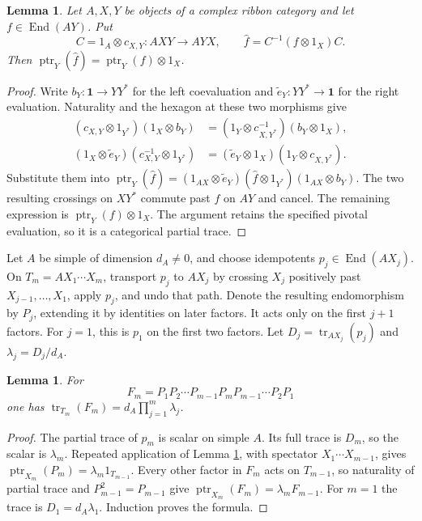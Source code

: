 \documentclass[10pt]{amsart}
\newcommand{\one}{\mathbf1}\newcommand{\C}{\mathcal C}
\newcommand{\tr}{\operatorname{tr}}\newcommand{\ptr}{\operatorname{ptr}}
\newtheorem{lemma}[theorem]{Lemma}
\begin{document}
\begin{lemma}\label{trace-superpose}
Let $A,X,Y$ be objects of a complex ribbon category and let
$f\in\operatorname{End}(A Y)$. Put
\[
 C=1_A\otimes c_{X,Y}:A X Y\longrightarrow A Y X,
 \qquad \widehat f=C^{-1}(f\otimes1_X)C.
\]
Then $\ptr_Y(\widehat f)=\ptr_Y(f)\otimes1_X$.
\end{lemma}
\begin{proof}
Write $b_Y:\one\to YY^*$ for the left coevaluation and
$\widetilde e_Y:YY^*\to\one$ for the right evaluation.
Naturality and the hexagon at these two morphisms give
\begin{align*}
 (c_{X,Y}\otimes1_{Y^*})(1_X\otimes b_Y)
   &=(1_Y\otimes c_{X,Y^*}^{-1})(b_Y\otimes1_X),\\
 (1_X\otimes\widetilde e_Y)(c_{X,Y}^{-1}\otimes1_{Y^*})
   &=(\widetilde e_Y\otimes1_X)(1_Y\otimes c_{X,Y^*}).
\end{align*}
Substitute them into
$\ptr_Y(\widehat f)=(1_{AX}\otimes\widetilde e_Y)
(\widehat f\otimes1_{Y^*})(1_{AX}\otimes b_Y)$.
The two resulting crossings on $X Y^*$ commute past
$f$ on $A Y$ and cancel. The remaining expression is
$\ptr_Y(f)\otimes1_X$. The argument retains the specified
pivotal evaluation, so it is a categorical partial trace.
\end{proof}

Let $A$ be simple of dimension $d_A\ne0$, and choose idempotents
$p_j\in\operatorname{End}(A X_j)$.
On $T_m=A X_1\cdots X_m$, transport $p_j$ to $A X_j$
by crossing $X_j$ positively past $X_{j-1},\ldots,X_1$,
apply $p_j$, and undo that path. Denote the resulting
endomorphism by $P_j$, extending it by identities on later factors.
It acts only on the first $j+1$ factors.
For $j=1$, this is $p_1$ on the first two factors.
Let $D_j=\tr_{A X_j}(p_j)$ and $\lambda_j=D_j/d_A$.

\begin{lemma}\label{trace-palindrome}
For
\[
 F_m=P_1P_2\cdots P_{m-1}P_mP_{m-1}\cdots P_2P_1
\]
one has $\tr_{T_m}(F_m)=d_A\prod_{j=1}^m\lambda_j$.
\end{lemma}
\begin{proof}
The partial trace of $p_m$ is scalar on simple $A$. Its full trace
is $D_m$, so the scalar is $\lambda_m$. Repeated application of
Lemma \ref{trace-superpose}, with spectator $X_1\cdots X_{m-1}$,
gives $\ptr_{X_m}(P_m)=\lambda_m1_{T_{m-1}}$.
Every other factor in $F_m$ acts on $T_{m-1}$, so naturality of
partial trace and $P_{m-1}^2=P_{m-1}$ give
$\ptr_{X_m}(F_m)=\lambda_mF_{m-1}$.
For $m=1$ the trace is $D_1=d_A\lambda_1$.
Induction proves the formula.
\end{proof}
\end{document}
